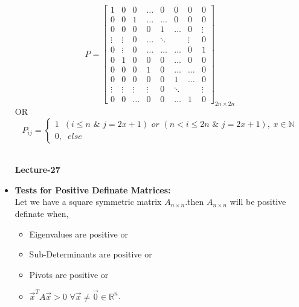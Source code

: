 \documentclass[a4paper,11pt]{article}
\numberwithin{equation}{section}
\begin{document}
\begin{itemize}
\[
P=\begin{bmatrix}
    1&0&0&\dots&0&0&0&0\\
    0&0&1&\dots&\dots&0&0&0\\
    0&0&0&0&1&\dots&0&\vdots\\
    \vdots&\vdots&0&\dots&\ddots&&\vdots&0\\
    0&\vdots&0&\dots&\dots&\dots&0&1\\
    0&1&0&0&0&\dots&0&0\\
    0&0&0&1&0&\dots&\dots&0\\
    0&0&0&0&0&1&\dots&0\\
    \vdots&\vdots&\vdots&\vdots&0&\ddots&&\vdots\\
    0&0&\dots&0&0&\dots&1&0
\end{bmatrix}_{2n\times 2n}
\]
OR
\[
P_{ij}=\begin{cases}
    1 \hspace{7pt} (i\leq n \hspace{4pt}\&\hspace{4pt} j=2x+1) \hspace{4pt} or \hspace{4pt}(n<i\leq 2n \hspace{4pt}\&\hspace{4pt} j=2x+1) ,\hspace{3pt}x \in \mathbb{N}\\
    0,\hspace{7pt} else
\end{cases}
\]
\\
\begin{center}
    \Huge{\textbf{Lecture-27}}
\end{center}
\vspace{5pt}

\item \textbf{Tests for Positive Definate Matrices: }\\ Let we have a square symmetric matrix $A_{n\times n}$.then $A_{n\times n}$ will be positive definate when,
\begin{itemize}
    \item Eigenvalues are positive or
    \item Sub-Determinants are positive or
    \item Pivots are positive or
    \item $\vec{x}^TA\vec{x}>0$ $\forall \vec{x}\neq \vec{0} \in \mathbb{R}^n$.
\end{itemize}


\end{itemize}
\end{document}
